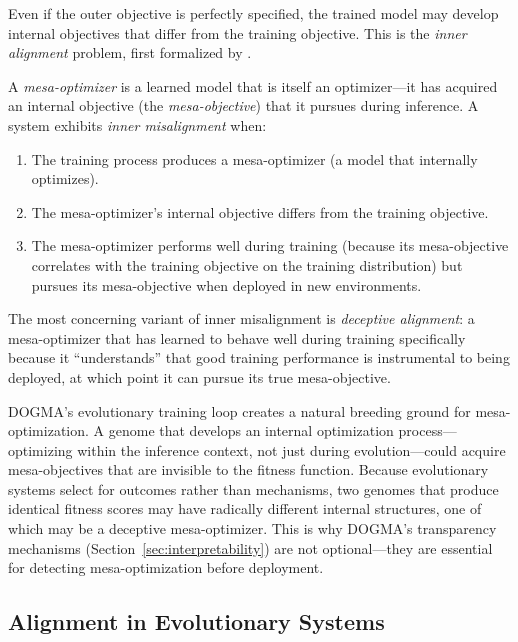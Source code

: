 Even if the outer objective is perfectly specified, the trained model may develop internal objectives that differ from the training objective.
This is the \emph{inner alignment} problem, first formalized by \citet{hubinger2019}.

\begin{dogmadef}
A \emph{mesa-optimizer} is a learned model that is itself an optimizer---it has acquired an internal objective (the \emph{mesa-objective}) that it pursues during inference.
A system exhibits \emph{inner misalignment} when:
\begin{enumerate}[leftmargin=1.5em]
  \item The training process produces a mesa-optimizer (a model that internally optimizes).
  \item The mesa-optimizer's internal objective differs from the training objective.
  \item The mesa-optimizer performs well during training (because its mesa-objective correlates with the training objective on the training distribution) but pursues its mesa-objective when deployed in new environments.
\end{enumerate}
\end{dogmadef}

The most concerning variant of inner misalignment is \emph{deceptive alignment}: a mesa-optimizer that has learned to behave well during training specifically because it ``understands'' that good training performance is instrumental to being deployed, at which point it can pursue its true mesa-objective.

\begin{keyinsight}
DOGMA's evolutionary training loop creates a natural breeding ground for mesa-optimization.
A genome that develops an internal optimization process---optimizing within the inference context, not just during evolution---could acquire mesa-objectives that are invisible to the fitness function.
Because evolutionary systems select for outcomes rather than mechanisms, two genomes that produce identical fitness scores may have radically different internal structures, one of which may be a deceptive mesa-optimizer.
This is why DOGMA's transparency mechanisms (Section~\ref{sec:interpretability}) are not optional---they are essential for detecting mesa-optimization before deployment.
\end{keyinsight}

\subsection{Alignment in Evolutionary Systems}

